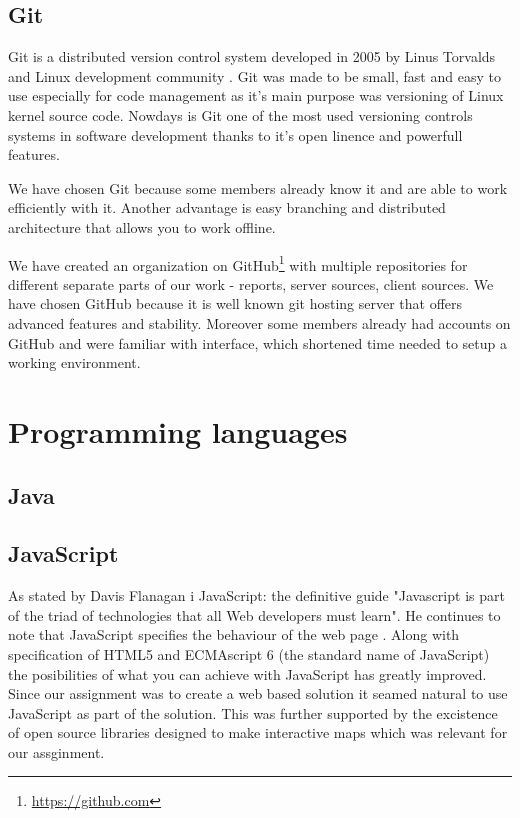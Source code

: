 \documentclass[11pt,a4paper,titlepage,oneside]{report}
\begin{document}
  \subsection{Git}
  Git is a distributed version control system developed in 2005 by Linus Torvalds and Linux development community \cite{ProGit}. Git was made to be small, fast and easy to use especially for code management as it's main purpose was versioning of Linux kernel source code. Nowdays is Git one of the most used versioning controls systems in software development thanks to it's open linence and powerfull features.

  We have chosen Git because some members already know it and are able to work efficiently with it. Another advantage is easy branching and distributed architecture that allows you to work offline. 
  
  We have created an organization on GitHub\footnote{\url{https://github.com}} with multiple repositories for different separate parts of our work - reports, server sources, client sources. We have chosen GitHub because it is well known git hosting server that offers advanced features and stability. Moreover some members already had accounts on GitHub and were familiar with interface, which shortened time needed to setup a working environment.

\section{Programming languages}
  \subsection{Java}
  \subsection{JavaScript}
  As stated by Davis Flanagan i JavaScript: the definitive guide "Javascript is part of the triad of technologies that all Web developers must learn". He continues to note that JavaScript specifies the behaviour of the web page \cite{fd11}. Along with specification of HTML5 and ECMAscript 6 (the standard name of JavaScript) the posibilities of what you can achieve with JavaScript has greatly improved. Since our assignment was to create a web based solution it seamed natural to use JavaScript as part of the solution. This was further supported by the excistence of open source libraries designed to make interactive maps which was relevant for our assginment.
\end{document}
